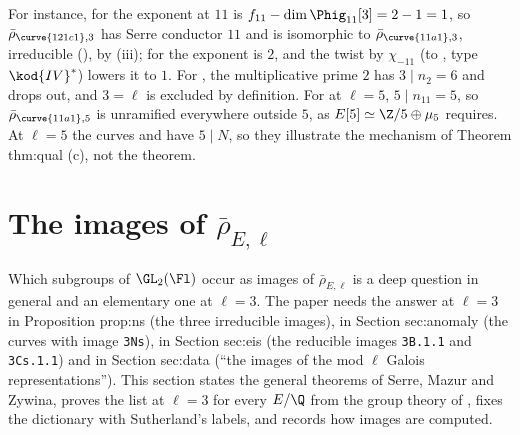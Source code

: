 \begin{example}
\begin{center}
\end{center}
For instance, for  the exponent at $11$ is $f_{11}-\dim\Phig_{11}[3]=2-1=1$, so $\bar\rho_{\curve{121c1},3}$ has Serre conductor $11$ and is isomorphic
to $\bar\rho_{\curve{11a1},3}$, irreducible (), by (iii); for  the exponent is $2$, and the
twist by $\chi_{-11}$ (to , type $\kod{IV}^*$) lowers it to $1$. For , the multiplicative prime $2$ has $3\mid n_2=6$ and drops out, and
$3=\ell$ is excluded by definition. For  at $\ell=5$, $5\mid n_{11}=5$, so $\bar\rho_{\curve{11a1},5}$ is unramified everywhere outside $5$, as $E[5]\simeq\Z/5\oplus\mu_5$
requires. At $\ell=5$ the curves  and  have $5\mid N$, so they illustrate the mechanism of Theorem thm:qual (c), not the theorem.
\end{example}

\section{The images of \texorpdfstring{$\bar\rho_{E,\ell}$}{rhobar}}\label{sec:galrep:images}

Which subgroups of $\GL_2(\Fl)$ occur as images of $\bar\rho_{E,\ell}$ is a deep question in general and an elementary one at $\ell=3$. The paper
needs the answer at $\ell=3$ in Proposition prop:ns (the three irreducible images), in Section sec:anomaly (the curves with image \texttt{3Ns}),
in Section sec:eis (the reducible images \texttt{3B.1.1} and \texttt{3Cs.1.1}) and in Section sec:data (``the images of the mod $\ell$ Galois
representations''). This section states the general theorems of Serre, Mazur and Zywina, proves the list at $\ell=3$ for every $E/\Q$ from the
group theory of , fixes the dictionary with Sutherland's labels, and records how images are computed.

